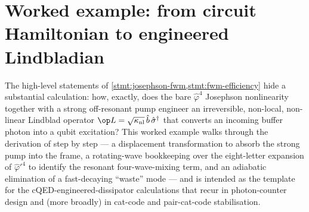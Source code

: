\section{Worked example: from circuit Hamiltonian to engineered Lindbladian}
\label{sec:lescanne-derivation}

\begin{example}
\label{ex:lescanne-smpd}
The high-level statements of \cref{stmt:josephson-fwm,stmt:fwm-efficiency}
hide a substantial calculation: how, exactly, does the bare $\hat\varphi^4$
Josephson nonlinearity together with a strong off-resonant pump engineer
an irreversible, non-local, non-linear Lindblad operator
$\op L=\sqrt{\kappa_{\rm nl}}\,\hat b\,\hat\sigma^\dagger$ that converts an
incoming buffer photon into a qubit excitation? This worked example
walks through the derivation of \cite{lescanne2020} step by step --- a
displacement transformation to absorb the strong pump into the frame, a
rotating-wave bookkeeping over the eight-letter expansion of $\hat\varphi'^4$
to identify the resonant four-wave-mixing term, and an adiabatic
elimination of a fast-decaying ``waste'' mode --- and is intended as the
template for the cQED-engineered-dissipator calculations that recur in
photon-counter design and (more broadly) in cat-code and pair-cat-code
stabilisation.
\end{example}

